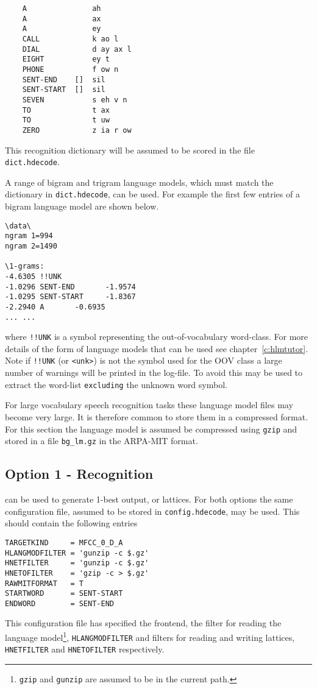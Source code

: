 \begin{verbatim}
    A               ah
    A               ax
    A               ey
    CALL            k ao l
    DIAL            d ay ax l
    EIGHT           ey t
    PHONE           f ow n
    SENT-END    []  sil
    SENT-START  []  sil
    SEVEN           s eh v n
    TO              t ax
    TO              t uw
    ZERO            z ia r ow
\end{verbatim}
This recognition dictionary will be assumed to be scored in the file
\texttt{dict.hdecode}.

A range of bigram and trigram language models, which must match the dictionary
in \texttt{dict.hdecode}, can be used.  For example the first few entries of a
bigram language model are shown below.
\begin{verbatim}
\data\
ngram 1=994
ngram 2=1490
 
\1-grams:
-4.6305 !!UNK
-1.0296 SENT-END       -1.9574
-1.0295 SENT-START     -1.8367
-2.2940 A       -0.6935
... ... 
\end{verbatim}
where \texttt{!!UNK} is a symbol representing the out-of-vocabulary
word-class. For more details of the form of language models that can be used
see chapter~\ref{c:hlmtutor}. Note if  \texttt{!!UNK} (or \texttt{<unk>}) is not the symbol used for the
OOV class a large number of warnings will be printed in the log-file. To avoid
this \htool{HLMCopy} may be used to extract the word-list \texttt{excluding}
the unknown word symbol.

For large vocabulary speech recognition tasks these language model files may become
very large. It is therefore common to store them in a compressed format. For
this section the language model is assumed be compressed using \texttt{gzip}
and stored in a file \texttt{bg\_lm.gz} in the ARPA-MIT format.

\subsection{Option  1 - Recognition}

 can be used to generate 1-best output, or 
lattices. For both options the same configuration file, assumed to be stored
in  \texttt{config.hdecode}, may be used. This should
contain the following entries
\begin{verbatim}
TARGETKIND     = MFCC_0_D_A   
HLANGMODFILTER = 'gunzip -c $.gz'
HNETFILTER     = 'gunzip -c $.gz'
HNETOFILTER    = 'gzip -c > $.gz'
RAWMITFORMAT   = T
STARTWORD      = SENT-START
ENDWORD        = SENT-END

\end{verbatim}
This configuration file has specified the frontend, the filter for reading the
language model\footnote{\texttt{gzip} and \texttt{gunzip} are assumed to be in the current
  path.}, \texttt{HLANGMODFILTER} and filters for reading and writing
lattices, \texttt{HNETFILTER} and \texttt{HNETOFILTER} respectively.

